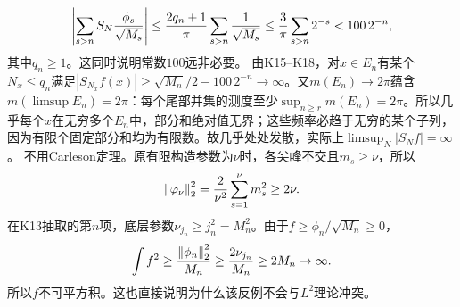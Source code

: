 \documentclass[UTF8,fontset=fandol,11pt]{ctexart}
\begin{document}
\[\left|\sum_{s>n}S_N\frac{\phi_s}{\sqrt{M_s}}\right|\le\frac{2q_n+1}{\pi}\sum_{s>n}\frac1{\sqrt{M_s}}\le\frac3\pi\sum_{s>n}2^{-s}<100\,2^{-n},\]
其中$q_n\ge1$。这同时说明常数$100$远非必要。
由K15--K18，对$x\in E_n$有某个$N_x\le q_n$满足$|S_{N_x}f(x)|\ge\sqrt{M_n}/2-100\,2^{-n}\to\infty$。又$m(E_n)\to2\pi$蕴含$m(\limsup E_n)=2\pi$：每个尾部并集的测度至少$\sup_{n\ge r}m(E_n)=2\pi$。所以几乎每个$x$在无穷多个$E_n$中，部分和绝对值无界；这些频率必趋于无穷的某个子列，因为有限个固定部分和均为有限数。故几乎处处发散，实际上$\limsup_N|S_Nf|=\infty$。
不用Carleson定理。原有限构造参数为$\nu$时，各尖峰不交且$m_s\ge\nu$，所以
\[\left\lVert\varphi_\nu\right\rVert_2^2=\frac2{\nu^2}\sum_{s=1}^{\nu}m_s^2\ge2\nu.\]
在K13抽取的第$n$项，底层参数$\nu_{j_n}\ge j_n^2=M_n^2$。由于$f\ge\phi_n/\sqrt{M_n}\ge0$，
\[\int f^2\ge\frac{\left\lVert\phi_n\right\rVert_2^2}{M_n}\ge\frac{2\nu_{j_n}}{M_n}\ge2M_n\to\infty.\]
所以$f$不可平方积。这也直接说明为什么该反例不会与$L^2$理论冲突。
\originalpages
\end{document}
